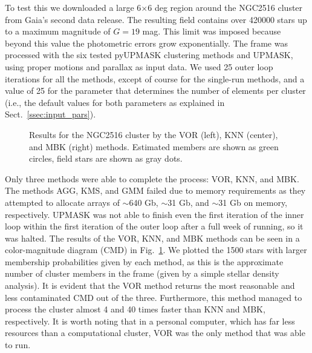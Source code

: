 \documentclass[draft]{aa}
\begin{document}
 To test this we downloaded a large 6$\times$6 deg region around the NGC2516
 cluster from Gaia's second data release. The resulting field contains over
 420000 stars up to a maximum magnitude of $G=19$ mag. This limit was imposed
 because beyond this value the photometric errors grow exponentially.
 The frame was processed with the six tested pyUPMASK clustering methods
 and UPMASK, using proper motions and parallax as input data. We used 25
 outer loop iterations for all the methods, except of course for
 the single-run methods, and a value of 25 for the parameter that determines
 the number of elements per cluster (i.e., the default values for both
 parameters as explained in Sect.~\ref{ssec:input_pars}).\\

 \begin{figure}
 \caption{Results for the NGC2516 cluster by the VOR (left), KNN (center), and
 MBK (right) methods. Estimated members are shown as green circles, field stars
 are shown as gray dots.}
 \label{fig:NGC2516}
 \end{figure}

 Only three methods were able to complete the process: VOR, KNN, and MBK. The
 methods AGG, KMS, and GMM failed due to memory requirements as they
 attempted to allocate arrays of $\sim$640 Gb, $\sim$31 Gb, and
 $\sim$31 Gb on memory, respectively. UPMASK was not able to finish even the
 first iteration of the inner loop within the first iteration of the outer loop
 after a full week of running, so it was halted.
 The results of the VOR, KNN, and MBK methods can be seen in a color-magnitude
 diagram (CMD) in Fig.~\ref{fig:NGC2516}. We plotted the 1500 stars with larger
 membership probabilities given by each method, as this is the approximate
 number of cluster members in the frame (given by a simple stellar density
 analysis). It is evident that the VOR method returns the most reasonable and
 less contaminated CMD out of the three. Furthermore, this method managed to
 process the cluster almost 4 and 40 times faster than KNN and MBK,
 respectively. It is worth noting that in a personal computer, which has far
 less resources than a computational cluster, VOR was the only method that
 was able to run.\\
\end{document}
